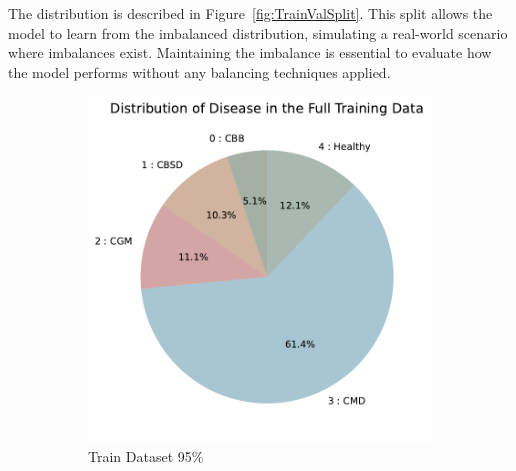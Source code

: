 The distribution is described in Figure~\ref{fig:TrainValSplit}. This split allows the model to learn from the imbalanced distribution, simulating a real-world scenario where imbalances exist. Maintaining the imbalance is essential to evaluate how the model performs without any balancing techniques applied.


\begin{figure}[t]
    \centering
    \begin{subfigure}{0.4\textwidth}
        \centering
        \includegraphics[width=\linewidth]{graphs/overview/Distribution of Disease in the Full Training Data.pdf}
        \caption{Train Dataset 95\%}
        \label{fig:ImbalancedTrain}
    \end{subfigure}
    \begin{subfigure}{0.4\textwidth}
        \centering

\end{subfigure}
\end{figure}
